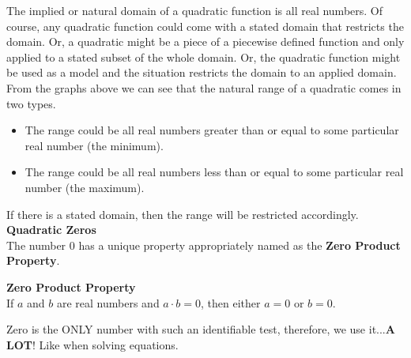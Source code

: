 \documentclass{ximera}
\begin{document}
The implied or natural domain of a quadratic function is all real numbers.  Of course, any quadratic function could come with a stated domain that restricts the domain. Or, a quadratic might be a piece of a piecewise defined function and only applied to a stated subset of the whole domain. Or, the quadratic function might be used as a model and the situation restricts the domain to an applied domain. \\


From the graphs above we can see that the natural range of a quadratic comes in two types.  

\begin{itemize}
\item The range could be all real numbers greater than or equal to some particular real number (the minimum).
\item The range could be all real numbers less than or equal to some particular real number (the maximum).
\end{itemize}

If there is a stated domain, then the range will be restricted accordingly. \\





\textbf{\textcolor{blue!75!black}{Quadratic Zeros}} \\

The number $0$ has a unique property appropriately named as the \textbf{Zero Product Property}.  



\begin{definition}  \textbf{\textcolor{green!50!black}{Zero Product Property}} \\

If $a$ and $b$ are real numbers and $a\cdot b = 0$, then either $a=0$ or $b=0$.

\end{definition}


Zero is the ONLY number with such an identifiable test, therefore, we use it...\textbf{\textcolor{purple!85!blue}{A LOT}}!   Like when solving equations. \\
\end{document}
